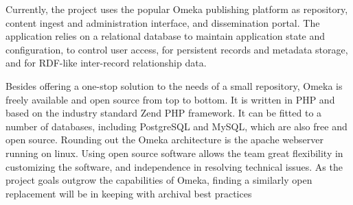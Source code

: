 Currently, the project uses the popular Omeka publishing platform as repository, content ingest and administration interface, and dissemination portal. The application relies on a relational database to maintain application state and configuration, to control user access, for persistent records and metadata storage, and for RDF-like inter-record relationship data. 

Besides offering a one-stop solution to the needs of a small repository, Omeka is freely available and open source from top to bottom. It is written in PHP and based on the industry standard Zend PHP framework. It can be fitted to a number of databases, including PostgreSQL and MySQL, which are also free and open source. Rounding out the Omeka architecture is the apache webserver running on linux. Using open source software allows the team great flexibility in customizing the software, and independence in resolving technical issues. As the project goals outgrow the capabilities of Omeka, finding a similarly open replacement will be in keeping with archival best practices \needcite


